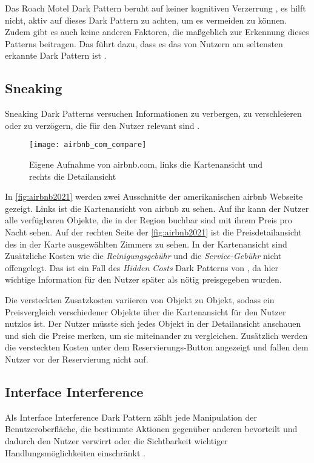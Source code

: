 \documentclass[conference,compsoc,final,a4paper]{IEEEtran}
\begin{document}
Das Roach Motel Dark Pattern beruht auf keiner kognitiven Verzerrung \autocite{Mathur2019}, es hilft nicht, aktiv auf dieses Dark Pattern zu achten, um es vermeiden zu können. Zudem gibt es auch keine anderen Faktoren, die maßgeblich zur Erkennung dieses Patterns beitragen. Das führt dazu, dass es das von Nutzern am seltensten erkannte Dark Pattern ist \autocite{M.Bhoot2020}.
\subsection{Sneaking}
Sneaking Dark Patterns versuchen Informationen zu verbergen, zu verschleieren oder zu verzögern, die für den Nutzer relevant sind \autocite{Gray_2018}.

\begin{figure}[ht!]
  \centering
  \texttt{[image: airbnb\_com\_compare]}
  \caption{Eigene Aufnahme von airbnb.com, links die Kartenansicht und rechts die Detailansicht ~\autocite{airbnb2021}}
  \label{fig:airbnb2021}
\end{figure}

In \autoref{fig:airbnb2021} werden zwei Ausschnitte der amerikanischen airbnb Webseite gezeigt. Links ist die Kartenansicht von airbnb zu sehen. Auf ihr kann der Nutzer alle verfügbaren Objekte, die in der Region buchbar sind mit ihrem Preis pro Nacht sehen. Auf der rechten Seite der \autoref{fig:airbnb2021} ist die Preisdetailansicht des in der Karte ausgewählten Zimmers zu sehen. In der Kartenansicht sind Zusätzliche Kosten wie die \textit{Reinigungsgebühr} und die \textit{Service-Gebühr} nicht offengelegt. Das ist ein Fall des \textit{Hidden Costs} Dark Patterns von \citeauthor{Brignull} \autocite{Brignull}, da hier wichtige Information für den Nutzer später als nötig preisgegeben wurden.

Die versteckten Zusatzkosten variieren von Objekt zu Objekt, sodass ein Preisvergleich verschiedener Objekte über die Kartenansicht für den Nutzer nutzlos ist. Der Nutzer müsste sich jedes Objekt in der Detailansicht anschauen und sich die Preise merken, um sie miteinander zu vergleichen. Zusätzlich werden die versteckten Kosten unter dem Reservierungs-Button angezeigt und fallen dem Nutzer vor der Reservierung nicht auf.

\subsection{Interface Interference}
Als Interface Interference Dark Pattern zählt jede Manipulation der Benutzeroberfläche, die bestimmte Aktionen gegenüber anderen bevorteilt und dadurch den Nutzer verwirrt oder die Sichtbarkeit wichtiger Handlungsmöglichkeiten einschränkt \autocite{Gray_2018}.
\end{document}
